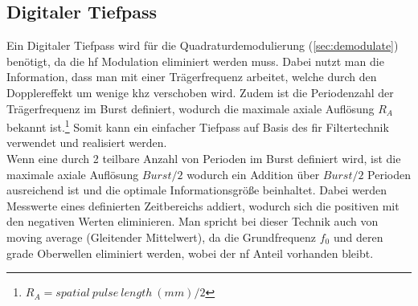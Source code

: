 \subsection{Digitaler Tiefpass}
Ein Digitaler Tiefpass wird für die Quadraturdemodulierung (\autoref{sec:demodulate}) benötigt, da die \ac{hf} Modulation eliminiert werden muss. Dabei nutzt man die Information, dass man mit einer Trägerfrequenz arbeitet, welche durch den Dopplereffekt um wenige \ac{khz} verschoben wird. Zudem ist die Periodenzahl der Trägerfrequenz im Burst definiert, wodurch die maximale axiale Auflösung $R_A$ bekannt ist.\footnote{$R_A=spatial\ pulse\ length\ (mm)/2$} Somit kann ein einfacher Tiefpass auf Basis des \ac{fir} Filtertechnik verwendet und realisiert werden.\\
Wenn eine durch 2 teilbare Anzahl von Perioden im Burst definiert wird, ist die maximale axiale Auflösung $Burst/2$ wodurch ein Addition über $Burst/2$ Perioden ausreichend ist und die optimale Informationsgröße beinhaltet. Dabei werden Messwerte eines definierten Zeitbereichs addiert, wodurch sich die positiven mit den negativen Werten eliminieren. Man spricht bei dieser Technik auch von moving average (Gleitender Mittelwert), da die Grundfrequenz \(f_0\) und deren grade Oberwellen eliminiert werden, wobei der \ac{nf} Anteil vorhanden bleibt. 

%
%
%

